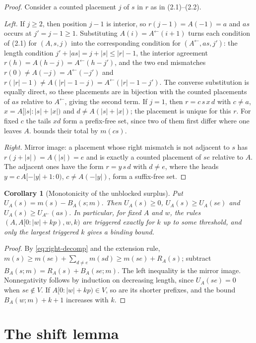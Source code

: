 \documentclass[11pt]{article}
\numberwithin{equation}{section}
\newtheorem{corollary}[theorem]{Corollary}
\theoremstyle{definition}
\newcommand{\len}[1]{\lvert #1\rvert}
\newcommand{\lsh}[1]{#1^{\leftarrow}}
\begin{document}
\begin{proof}
Consider a counted placement $j$ of $s$ in $r$ as in (2.1)--(2.2).

\emph{Left.} If $j\ge2$, then position $j-1$ is interior, so $r(j-1)=A(-1)=a$
and $as$ occurs at $j'=j-1\ge1$. Substituting $A(i)=\lsh A(i+1)$ turns each
condition of (2.1) for $(A,s,j)$ into the corresponding condition for
$(\lsh A,as,j')$: the length condition $j'+\len{as}=j+\len s\le\len r-1$, the
interior agreement $r(h)=A(h-j)=\lsh A(h-j')$, and the two end mismatches
$r(0)\ne A(-j)=\lsh A(-j')$ and
$r(\len r-1)\ne A(\len r-1-j)=\lsh A(\len r-1-j')$. The converse substitution
is equally direct, so these placements are in bijection with the counted
placements of $as$ relative to $\lsh A$, giving the second term. If $j=1$, then
$r=c\,s\,x\,d$ with $c\ne a$, $x=A[\len s:\len s+\len x)$ and
$d\ne A(\len s+\len x)$; the placement is unique for this $r$. For fixed $c$
the tails $x d$ form a prefix-free set, since two of them first differ where
one leaves $A$.  bounds their total by $m(cs)$.

\emph{Right.} Mirror image: a placement whose right mismatch is not adjacent
to $s$ has $r(j+\len s)=A(\len s)=e$ and is exactly a counted placement of
$se$ relative to $A$. The adjacent ones have the form $r=y\,s\,d$ with
$d\ne e$, where the heads $y=c\,A[-\len y+1:0)$, $c\ne A(-\len y)$, form a
suffix-free set.
\end{proof}

\begin{corollary}[Monotonicity of the unblocked surplus]\label{cor:mono}
Put $U_A(s)=m(s)-B_A(s;m)$. Then $U_A(s)\ge0$, $U_A(s)\ge U_A(se)$ and
$U_A(s)\ge U_{\lsh A}(as)$. In particular, for fixed $A$ and $w$, the
rules $(A,A[0:\len w+kp),w,k)$ are triggered exactly for $k$ up to some
threshold, and only the largest triggered $k$ gives a binding bound.
\end{corollary}

\begin{proof}
By \eqref{eq:right-decomp} and the extension rule,
$m(s)\ge m(se)+\sum_{d\ne e}m(sd)\ge m(se)+R_A(s)$; subtract
$B_A(s;m)=R_A(s)+B_A(se;m)$. The left inequality is the mirror image.
Nonnegativity follows by induction on decreasing length, since $U_A(se)=0$
when $se\notin V$. If $A[0:\len w+kp)\in V$, so are its shorter prefixes, and
the bound $B_A(w;m)+k+1$ increases with $k$.
\end{proof}

\section{The shift lemma}
\end{document}
